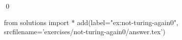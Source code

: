 
\begin{ex} 
  \label{ex:not-turing-again0}
  
  \qed
\end{ex} 
\begin{python0}
from solutions import *
add(label="ex:not-turing-again0",
    srcfilename='exercises/not-turing-again0/answer.tex') 
\end{python0}
